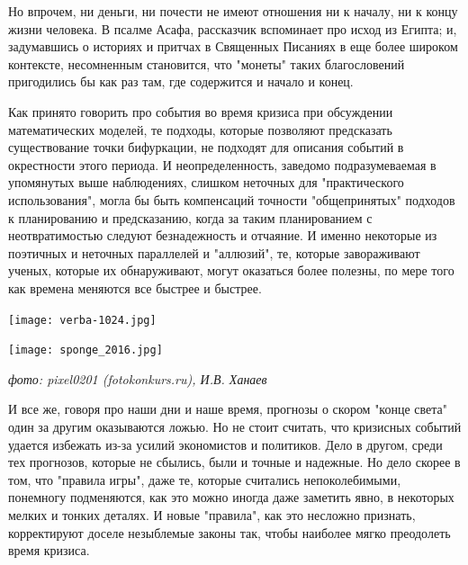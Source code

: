 \vskip 24pt

Но впрочем, ни деньги, ни почести не имеют отношения ни к началу, ни к концу жизни человека. В псалме Асафа, рассказчик вспоминает про исход из Египта; и, задумавшись о историях и притчах в Священных Писаниях в еще более широком контексте, несомненным становится, что "монеты" таких благословений пригодились бы как раз там, где содержится и начало и конец.

Как принято говорить про события во время кризиса при обсуждении математических моделей, те подходы, которые позволяют предсказать существование точки бифуркации, не подходят для описания событий в окрестности этого периода. И неопределенность, заведомо подразумеваемая в упомянутых выше наблюдениях, слишком неточных для "практического использования", могла бы быть компенсаций точности "общепринятых" подходов к планированию и предсказанию, когда за таким планированием с неотвратимостью следуют безнадежность и отчаяние. И именно некоторые из поэтичных и неточных параллелей и "аллюзий", те, которые завораживают ученых, которые их обнаруживают, могут оказаться более полезны, по мере того как времена меняются все быстрее и быстрее.

{\centering

  \vskip 18pt
  \begin{minipage}[ht]{0.49\linewidth}\centering
    \texttt{[image: verba-1024.jpg]} \\ 
  \end{minipage}
  \hfill
  \begin{minipage}[ht]{0.49\linewidth}\centering
    \texttt{[image: sponge\_2016.jpg]} \\ 
  \end{minipage}
  \vskip 12pt
  
\itshape
\fontsize{10pt}{10pt}\selectfont
фото: pixel0201 (fotokonkurs.ru), И.В. Ханаев

\vskip 18pt
} 
  
И все же, говоря про наши дни и наше время, прогнозы о скором "конце света" один за другим оказываются ложью. Но не стоит считать, что кризисных событий удается избежать из-за усилий экономистов и политиков. Дело в другом, среди тех прогнозов, которые не сбылись, были и точные и надежные. Но дело скорее в том, что "правила игры", даже те, которые считались непоколебимыми, понемногу подменяются, как это можно иногда даже заметить явно, в некоторых мелких и тонких деталях. И новые "правила", как это несложно признать, корректируют доселе незыблемые законы так, чтобы наиболее мягко преодолеть время кризиса.





